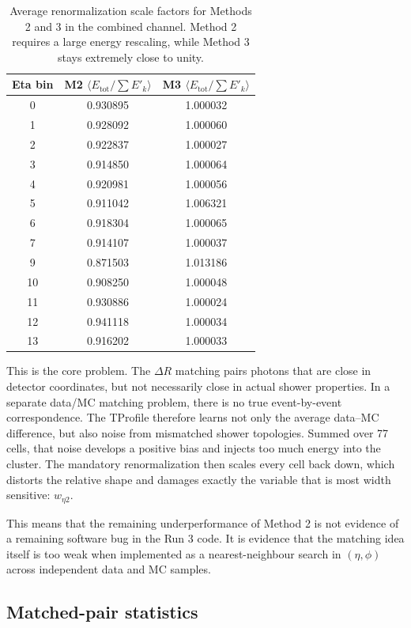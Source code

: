 \documentclass[11pt,a4paper]{article}
\newcommand{\weta}{\ensuremath{w_{\eta 2}}}
\begin{document}
\begin{table}[H]
\centering
\caption{Average renormalization scale factors for Methods 2 and 3 in the combined channel. Method 2 requires a large energy rescaling, while Method 3 stays extremely close to unity.}
\label{tab:renorm-scales}
\begin{tabular}{ccc}
\toprule
Eta bin & M2 $\langle E_{\mathrm{tot}} / \sum E'_k \rangle$ & M3 $\langle E_{\mathrm{tot}} / \sum E'_k \rangle$ \\
\midrule
0 & 0.930895 & 1.000032 \\
1 & 0.928092 & 1.000060 \\
2 & 0.922837 & 1.000027 \\
3 & 0.914850 & 1.000064 \\
4 & 0.920981 & 1.000056 \\
5 & 0.911042 & 1.006321 \\
6 & 0.918304 & 1.000065 \\
7 & 0.914107 & 1.000037 \\
9 & 0.871503 & 1.013186 \\
10 & 0.908250 & 1.000048 \\
11 & 0.930886 & 1.000024 \\
12 & 0.941118 & 1.000034 \\
13 & 0.916202 & 1.000033 \\
\bottomrule
\end{tabular}
\end{table}

This is the core problem. The $\Delta R$ matching pairs photons that are close
in detector coordinates, but not necessarily close in actual shower properties.
In a separate data/MC matching problem, there is no true event-by-event
correspondence. The TProfile therefore learns not only the average data--MC
difference, but also noise from mismatched shower topologies. Summed over 77
cells, that noise develops a positive bias and injects too much energy into the
cluster. The mandatory renormalization then scales every cell back down, which
distorts the relative shape and damages exactly the variable that is most width
sensitive: \weta.

This means that the remaining underperformance of Method 2 is not evidence of a
remaining software bug in the Run 3 code. It is evidence that the matching idea
itself is too weak when implemented as a nearest-neighbour search in
$(\eta,\phi)$ across independent data and MC samples.

\subsection{Matched-pair statistics}
\end{document}
